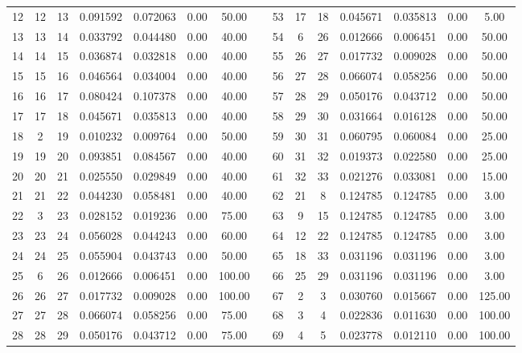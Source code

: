\documentclass[preprint,12pt]{elsarticle}
\begin{document}
\begin{table}[htbp!]
{\begin{tabular}{ccccccc c ccccccc}
            12 & 12 & 13 & 0.091592 & 0.072063 & 0.00 & 50.00 &  & 53 & 17 & 18 & 0.045671 & 0.035813 & 0.00 & 5.00\\
            13 & 13 & 14 & 0.033792 & 0.044480 & 0.00 & 40.00 &  & 54 & 6 & 26 & 0.012666 & 0.006451 & 0.00 & 50.00\\
            14 & 14 & 15 & 0.036874 & 0.032818 & 0.00 & 40.00 &  & 55 & 26 & 27 & 0.017732 & 0.009028 & 0.00 & 50.00\\
            15 & 15 & 16 & 0.046564 & 0.034004 & 0.00 & 40.00 &  & 56 & 27 & 28 & 0.066074 & 0.058256 & 0.00 & 50.00\\
            16 & 16 & 17 & 0.080424 & 0.107378 & 0.00 & 40.00 &  & 57 & 28 & 29 & 0.050176 & 0.043712 & 0.00 & 50.00\\
            17 & 17 & 18 & 0.045671 & 0.035813 & 0.00 & 40.00 &  & 58 & 29 & 30 & 0.031664 & 0.016128 & 0.00 & 50.00\\
            18 & 2 & 19 & 0.010232 & 0.009764 & 0.00 & 50.00 &  & 59 & 30 & 31 & 0.060795 & 0.060084 & 0.00 & 25.00\\
            19 & 19 & 20 & 0.093851 & 0.084567 & 0.00 & 40.00 &  & 60 & 31 & 32 & 0.019373 & 0.022580 & 0.00 & 25.00\\
            20 & 20 & 21 & 0.025550 & 0.029849 & 0.00 & 40.00 &  & 61 & 32 & 33 & 0.021276 & 0.033081 & 0.00 & 15.00\\
            21 & 21 & 22 & 0.044230 & 0.058481 & 0.00 & 40.00 &  & 62 & 21 & 8 & 0.124785 & 0.124785 & 0.00 & 3.00\\
            22 & 3 & 23 & 0.028152 & 0.019236 & 0.00 & 75.00 &  & 63 & 9 & 15 & 0.124785 & 0.124785 & 0.00 & 3.00\\
            23 & 23 & 24 & 0.056028 & 0.044243 & 0.00 & 60.00 &  & 64 & 12 & 22 & 0.124785 & 0.124785 & 0.00 & 3.00\\
            24 & 24 & 25 & 0.055904 & 0.043743 & 0.00 & 50.00 &  & 65 & 18 & 33 & 0.031196 & 0.031196 & 0.00 & 3.00\\
            25 & 6 & 26 & 0.012666 & 0.006451 & 0.00 & 100.00 &  & 66 & 25 & 29 & 0.031196 & 0.031196 & 0.00 & 3.00\\
            26 & 26 & 27 & 0.017732 & 0.009028 & 0.00 & 100.00 &  & 67 & 2 & 3 & 0.030760 & 0.015667 & 0.00 & 125.00\\
            27 & 27 & 28 & 0.066074 & 0.058256 & 0.00 & 75.00 &  & 68 & 3 & 4 & 0.022836 & 0.011630 & 0.00 & 100.00\\
            28 & 28 & 29 & 0.050176 & 0.043712 & 0.00 & 75.00 &  & 69 & 4 & 5 & 0.023778 & 0.012110 & 0.00 & 100.00\\

\end{tabular}}
\end{table}
\end{document}
